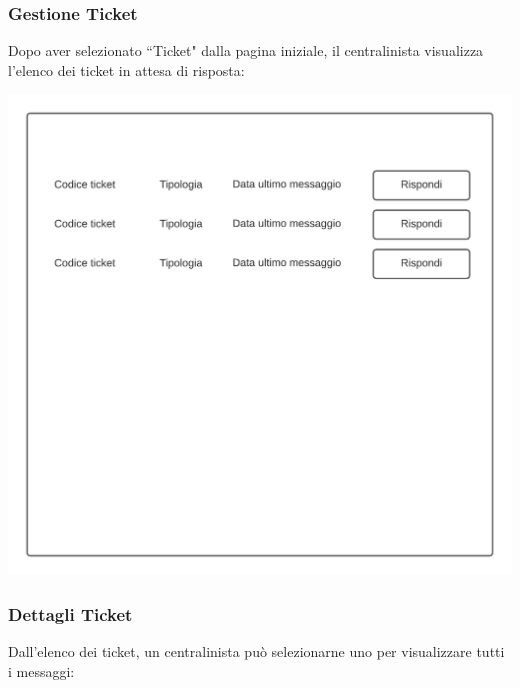\documentclass[12pt]{article}
\begin{document}
\subsubsection{Gestione Ticket}
Dopo aver selezionato ``Ticket" dalla pagina iniziale, il centralinista visualizza l'elenco dei ticket in attesa di risposta:

\begin{center}
\includegraphics[height=0.3\textheight]{Mockup/Centralinista/ElencoTicket}
\end{center}

\newpage

\subsubsection{Dettagli Ticket}
Dall'elenco dei ticket, un centralinista può selezionarne uno per visualizzare tutti i messaggi:
\end{document}
